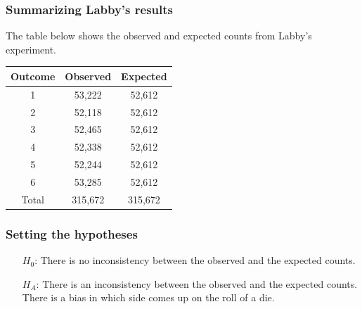 \documentclass[notes,11pt, aspectratio=169]{beamer}
\begin{document}

\begin{frame}
\frametitle{Summarizing Labby's results}

The table below shows the observed and expected counts from Labby's experiment.

{\small
\begin{center}
\renewcommand\arraystretch{1.2}
\begin{tabular}{c | c c}
Outcome	& Observed	& Expected \\
\hline
1		& 53,222		& 52,612 \\
2		& 52,118		& 52,612 \\
3		& 52,465		& 52,612 \\
4		& 52,338		& 52,612 \\
5		& 52,244		& 52,612 \\
6		& 53,285		& 52,612 \\
\hline
Total		& 315,672		& 315,672
\end{tabular}
\end{center}
}

\pause
{}

\end{frame}


\begin{frame}
\frametitle{Setting the hypotheses}


\pause

\begin{itemize}
\item[$H_0$:] There is no inconsistency between the observed and the expected counts. 

\pause

\item[$H_A$:] There is an inconsistency between the observed and the expected counts.  There is a bias in which side comes up on the roll of a die.
\end{itemize}

\end{frame}
\end{document}
